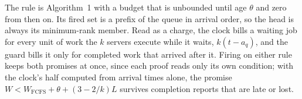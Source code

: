 The rule is Algorithm~1 with a budget that is unbounded until age $\theta$ and zero from
then on. Its fired set is a prefix of the queue in arrival order, so the head is
always its minimum-rank member. Read as a charge, the clock bills a waiting job for
every unit of work the $k$ servers execute while it waits, $k(t - a_q)$, and the guard
bills it only for completed work that arrived after it. Firing on either rule keeps
both promises at once, since each proof reads only its own condition; with the clock's
half computed from arrival times alone, the promise
$W < W_{\mathrm{FCFS}} + \theta + (3-2/k)L$ survives completion reports that are late
or lost.
